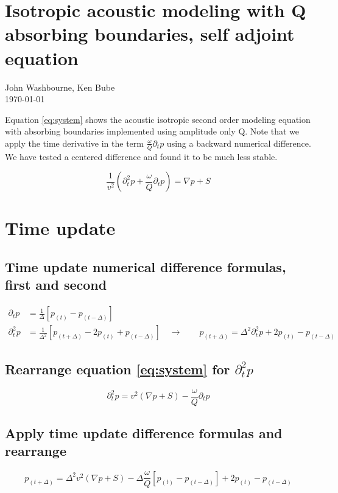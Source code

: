 \documentclass[10pt,fleqn]{article}
\begin{document}
\section{Isotropic acoustic modeling with Q absorbing boundaries, self adjoint equation}
John Washbourne, Ken Bube\\
\today
\vspace{10pt}

Equation \ref{eq:system} shows the acoustic isotropic second order modeling equation with absorbing boundaries implemented using amplitude only Q.
Note that we apply the time derivative in the term $\displaystyle \frac{\omega}{Q} \partial_t p $
using a backward numerical difference.  We have tested a centered difference and found it to be much less stable.

\begin{equation}
\frac{1}{v^2} \left( \partial_t^2 p + \frac{\omega}{Q} \partial_t p \right) = \nabla p + S
\label{eq:system}
\end{equation}

\section{Time update}
\subsection{Time update numerical difference formulas, first and second}
\begin{equation}
\begin{aligned}
\partial_t p  &= \frac{1}{\Delta} \left[ p_{(t)} - p_{(t - \Delta)} \right] \\[10pt]
\partial_t^2 p &= \frac{1}{\Delta^2} \left[ p_{(t+\Delta)} - 2 p_{(t)} + p_{(t - \Delta)} \right] \quad \rightarrow \qquad p_{(t+\Delta)} = \Delta^2 \partial_t^2 p + 2 p_{(t)} - p_{(t - \Delta)}
\end{aligned}
\end{equation}

\subsection{Rearrange equation \ref{eq:system} for $\partial_t^2 p$}
\begin{equation}
\partial_t^2 p = v^2 \left( \nabla p + S \right) - \frac{\omega}{Q} \partial_t p 
\end{equation}

\subsection{Apply time update difference formulas and rearrange}
\begin{equation}
p_{(t+\Delta)} = \Delta^2 v^2 \left( \nabla p + S \right) - \Delta \frac{\omega}{Q} \left[ p_{(t)} - p_{(t - \Delta)} \right] 
+ 2 p_{(t)} - p_{(t - \Delta)} 
\end{equation}
\end{document}
